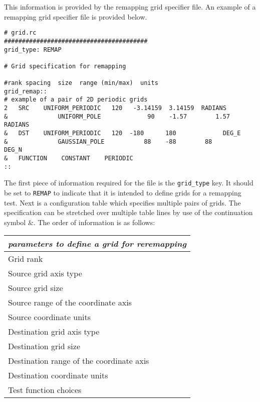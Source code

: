 This information is provided by the remapping grid specifier file.
An example of a remapping grid specifier file is provided below. 
\begin{center}
\begin{verbatim}
# grid.rc
########################################
grid_type: REMAP

# Grid specification for remapping

#rank spacing  size  range (min/max)  units
grid_remap::
# example of a pair of 2D periodic grids 
2   SRC    UNIFORM_PERIODIC   120   -3.14159  3.14159  RADIANS   
&              UNIFORM_POLE             90    -1.57        1.57        RADIANS   
&   DST    UNIFORM_PERIODIC   120  -180      180             DEG_E   
&              GAUSSIAN_POLE           88    -88        88             DEG_N   
&   FUNCTION    CONSTANT    PERIODIC
::
\end{verbatim}
\end{center}

The first piece of information required for the file is the \texttt{grid\_type} key. It should be set to \texttt{REMAP} to indicate that it is intended to define grids for a remapping test. Next is a configuration table which specifies multiple pairs of grids. The specification can be stretched over multiple table lines by use of the continuation symbol $\&$. The order of information is as follows:
\begin{center}
\begin{tabular}{| l |} \hline 
{\em parameters to define a grid for reremapping }  \\
\hline \hline
 Grid rank    \\
 Source grid axis type   \\
 Source grid size \\
 Source range of the coordinate axis  \\
 Source coordinate units \\
 Destination grid axis type   \\
 Destination grid size \\
 Destination range of the coordinate axis  \\
 Destination coordinate units \\
 Test function choices \\
\hline 
\end{tabular}
\end{center}

